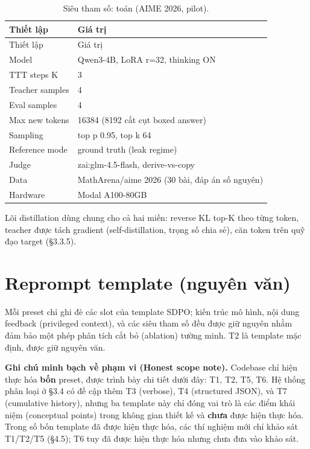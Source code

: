 \begin{longtable}{ll}
\caption{Siêu tham số: toán (AIME 2026, pilot).}\\
\toprule
Thiết lập & Giá trị \\
\midrule
\endfirsthead
\toprule
Thiết lập & Giá trị \\
\midrule
\endhead
\bottomrule
\endfoot
Model & Qwen3-4B, LoRA r=32, thinking ON \\
TTT steps K & 3 \\
Teacher samples & 4 \\
Eval samples & 4 \\
Max new tokens & 16384 (8192 cắt cụt boxed answer) \\
Sampling & top p 0.95, top k 64 \\
Reference mode & ground truth (leak regime) \\
Judge & zai:glm-4.5-flash, derive-vs-copy \\
Data & MathArena/aime 2026 (30 bài, đáp án số nguyên) \\
Hardware & Modal A100-80GB \\
\end{longtable}

Lõi distillation dùng chung cho cả hai miền: reverse KL top-K theo từng token, teacher được tách gradient (self-distillation, trọng số chia sẻ), căn token trên quỹ đạo target (§3.3.5).

\chapter{Reprompt template (nguyên văn)}\label{appendix-b-reprompt-templates-verbatim}

Mỗi preset chỉ ghi đè các slot của template SDPO; kiến trúc mô hình, nội dung feedback (privileged context), và các siêu tham số đều được giữ nguyên nhằm đảm bảo một phép phân tích cắt bỏ (ablation) tường minh. T2 là template mặc định, được giữ nguyên văn.

\textbf{Ghi chú minh bạch về phạm vi (Honest scope note).} Codebase chỉ hiện thực hóa \textbf{bốn} preset, được trình bày chi tiết dưới đây: T1, T2, T5, T6. Hệ thống phân loại ở §3.4 có đề cập thêm T3 (verbose), T4 (structured JSON), và T7 (cumulative history), nhưng ba template này chỉ đóng vai trò là các điểm khái niệm (conceptual points) trong không gian thiết kế và \textbf{chưa} được hiện thực hóa. Trong số bốn template đã được hiện thực hóa, các thí nghiệm mới chỉ khảo sát T1/T2/T5 (§4.5); T6 tuy đã được hiện thực hóa nhưng chưa đưa vào khảo sát.


